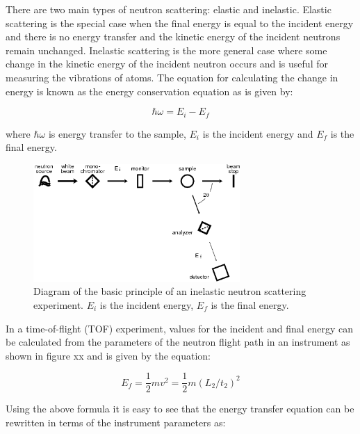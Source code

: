 \documentclass[paper=a4, fontsize=11pt]{scrartcl}	%
\numberwithin{equation}{section}															%
\numberwithin{figure}{section}																%
\numberwithin{table}{section}																%
\begin{document}
There are two main types of neutron scattering: elastic and inelastic. Elastic scattering is the special case when the final energy is equal to the incident energy and there is no energy transfer and the kinetic energy of the incident neutrons remain unchanged. Inelastic scattering is the more general case where some change in the kinetic energy of the incident neutron occurs and is useful for measuring the vibrations of atoms\cite{rpynn2008}. The equation for calculating the change in energy is known as the energy conservation equation as is given by:

\begin{equation*}
\hbar\omega = E_i - E_f
\end{equation*}

where $\hbar\omega$ is energy transfer to the sample, $E_i$ is the incident energy and $E_f$ is the final energy\cite{hschober2009}.

\begin{figure}[H]
\centering
\includegraphics[width=0.7\textwidth]{img/Inelastic-neutron-scattering-basics.png}
\caption{Diagram of the basic principle of an inelastic neutron scattering experiment. $E_i$ is the incident energy, $E_f$ is the final energy.}
\label{fig:indirect-inelastic-diagram}
\end{figure}

In a time-of-flight (TOF) experiment, values for the incident and final energy can be calculated from the parameters of the neutron flight path in an instrument as shown in figure xx and is given by the equation:

\begin{equation*}
E_f = \frac{1}{2}mv^2 = \frac{1}{2}m ( L_2 / t_2 ) ^2 
\end{equation*}

Using the above formula it is easy to see that the energy transfer equation can be rewritten in terms of the instrument parameters as:
\end{document}

